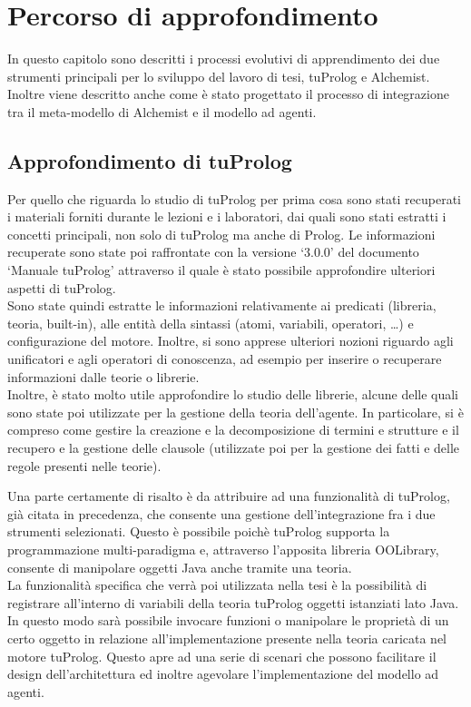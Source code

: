 \chapter{Percorso di approfondimento}
\lhead[\fancyplain{}{\bfseries\thepage}]{\fancyplain{}{\bfseries\rightmark}}

In questo capitolo sono descritti i processi evolutivi di apprendimento dei due strumenti principali per lo sviluppo del lavoro di tesi, tuProlog e Alchemist. Inoltre viene descritto anche come è stato progettato il processo di integrazione tra il meta-modello di Alchemist e il modello ad agenti.

\section{Approfondimento di tuProlog}
Per quello che riguarda lo studio di tuProlog per prima cosa sono stati recuperati i materiali forniti durante le lezioni e i laboratori, dai quali sono stati estratti i concetti principali, non solo di tuProlog ma anche di Prolog.
Le informazioni recuperate sono state poi raffrontate con la versione `3.0.0' del documento `Manuale tuProlog' attraverso il quale è stato possibile approfondire ulteriori aspetti di tuProlog.
\\
Sono state quindi estratte le informazioni relativamente ai predicati (libreria, teoria, built-in), alle entità della sintassi (atomi, variabili, operatori, \ldots) e configurazione del motore. Inoltre, si sono apprese ulteriori nozioni riguardo agli unificatori e agli operatori di conoscenza, ad esempio per inserire o recuperare informazioni dalle teorie o librerie.
\\
Inoltre, è stato molto utile approfondire lo studio delle librerie, alcune delle quali sono state poi utilizzate per la gestione della teoria dell'agente. In particolare, si è compreso come gestire la creazione e la decomposizione di termini e strutture e il recupero e la gestione delle clausole (utilizzate poi per la gestione dei fatti e delle regole presenti nelle teorie).

Una parte certamente di risalto è da attribuire ad una funzionalità di tuProlog, già citata in precedenza, che consente una gestione dell'integrazione fra i due strumenti selezionati. Questo è possibile poichè tuProlog supporta la programmazione multi-paradigma e, attraverso l'apposita libreria OOLibrary, consente di manipolare oggetti Java anche tramite una teoria.
\\
La funzionalità specifica che verrà poi utilizzata nella tesi è la possibilità di registrare all'interno di variabili della teoria tuProlog oggetti istanziati lato Java. In questo modo sarà possibile invocare funzioni o manipolare le proprietà di un certo oggetto in relazione all'implementazione presente nella teoria caricata nel motore tuProlog.
Questo apre ad una serie di scenari che possono facilitare il design dell'architettura ed inoltre agevolare l'implementazione del modello ad agenti.

